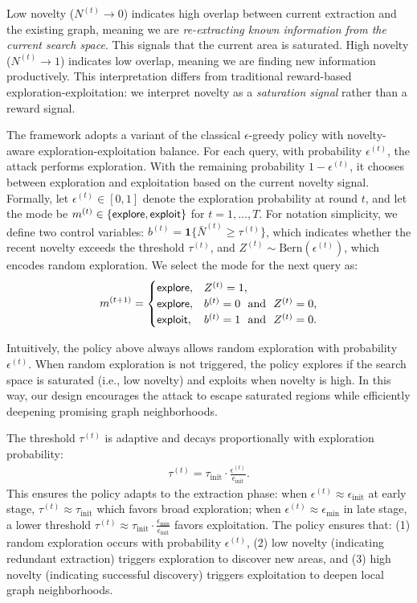 Low novelty ($N^{(t)} \to 0$) indicates high overlap between current extraction and the existing graph, meaning we are \emph{re-extracting known information from the current search space}. This signals that the current area is saturated. High novelty ($N^{(t)} \to 1$) indicates low overlap, meaning we are finding new information productively. This interpretation differs from traditional reward-based exploration-exploitation: we interpret novelty as a \emph{saturation signal} rather than a reward signal.

The framework adopts a variant of the classical $\epsilon$-greedy policy with novelty-aware exploration-exploitation balance.
For each query, with probability $\epsilon^{(t)}$, the attack performs exploration. With the remaining probability $1-\epsilon^{(t)}$, it chooses between exploration and exploitation based on the current novelty signal. 
Formally, let $\epsilon^{(t)} \in [0,1]$ denote the exploration probability at round $t$, and let the mode be $m^{(t)} \in \{{\sf explore}, {\sf exploit}\}$ for $t = 1,\ldots,T$.
For notation simplicity, we define two control variables:
$b^{(t)} = \mathbf{1}\{\bar{N}^{(t)} \ge \tau^{(t)}\}$, which indicates whether the recent novelty exceeds the threshold $\tau^{(t)}$, and
$Z^{(t)} \sim \mathrm{Bern}(\epsilon^{(t)})$, which encodes random exploration. 
We select the mode for the next query as: 
\begin{align*}
m^{(t+1)} =
\begin{cases}
{\sf explore}, & Z^{(t)}=1,\\
{\sf explore}, & b^{(t)}=0 \ \mathrm{~and~}\ Z^{(t)}=0,\\
{\sf exploit}, & b^{(t)}=1 \ \mathrm{~and~}\ Z^{(t)}=0.
\end{cases}
\end{align*}

Intuitively, the policy above always allows random exploration with probability $\epsilon^{(t)}$. When random exploration is not triggered, the policy explores if the search space is saturated (i.e., low novelty) and exploits when novelty is high. 
In this way, our design encourages the attack to escape saturated regions while efficiently deepening promising graph neighborhoods.


The threshold $\tau^{(t)}$ is adaptive and decays proportionally with exploration probability: 
\begin{align}
\tau^{(t)} = \tau_{\text{init}} \cdot \frac{\epsilon^{(t)}}{\epsilon_{\text{init}}}.
\end{align}
This ensures the policy adapts to the extraction phase: when $\epsilon^{(t)} \approx \epsilon_{\text{init}}$ at early stage, $\tau^{(t)} \approx \tau_{\text{init}}$ which favors broad exploration; when $\epsilon^{(t)} \approx \epsilon_{\min}$ in late stage, 
a lower threshold $\tau^{(t)} \approx \tau_{\text{init}} \cdot \frac{\epsilon_{\min}}{\epsilon_{\text{init}}}$  favors exploitation. The policy ensures that: (1) random exploration occurs with probability $\epsilon^{(t)}$, (2) low novelty (indicating redundant extraction) triggers exploration to discover new areas, and (3) high novelty (indicating successful discovery) triggers exploitation to deepen local graph neighborhoods.



